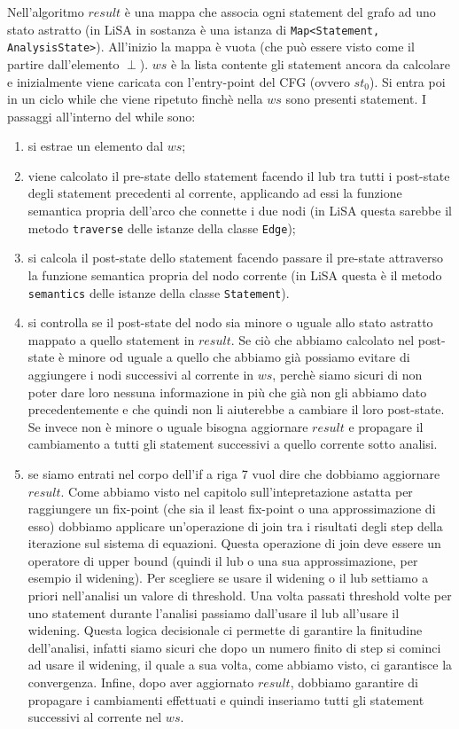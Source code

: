 Nell'algoritmo \(result\) è una mappa che associa ogni statement del grafo ad uno stato astratto (in LiSA in sostanza è una istanza di \texttt{Map<Statement, AnalysisState>}). All'inizio la mappa è vuota (che può essere visto come il partire dall'elemento \(\perp\)). \(ws\) è la lista contente gli statement ancora da calcolare e inizialmente viene caricata con l'entry-point del CFG (ovvero \(st_0\)). Si entra poi in un ciclo while che viene ripetuto finchè nella \(ws\) sono presenti statement. I passaggi all'interno del while sono:
\begin{enumerate}
\itemsep0em 
    \item si estrae un elemento dal \(ws\);
    \item viene calcolato il pre-state dello statement facendo il lub tra tutti i post-state degli statement precedenti al corrente, applicando ad essi la funzione semantica propria dell'arco che connette i due nodi (in LiSA questa sarebbe il metodo \texttt{traverse} delle istanze della classe \texttt{Edge});
    \item si calcola il post-state dello statement facendo passare il pre-state attraverso la funzione semantica propria del nodo corrente (in LiSA questa è il metodo \texttt{semantics} delle istanze della classe \texttt{Statement}).
    \item si controlla se il post-state del nodo sia minore o uguale allo stato astratto mappato a quello statement in \(result\). Se ciò che abbiamo calcolato nel post-state è minore od uguale a quello che abbiamo già possiamo evitare di aggiungere i nodi successivi al corrente in \(ws\), perchè siamo sicuri di non poter dare loro nessuna informazione in più che già non gli abbiamo dato precedentemente e che quindi non li aiuterebbe a cambiare il loro post-state. Se invece non è minore o uguale bisogna aggiornare \(result\) e propagare il cambiamento a tutti gli statement successivi a quello corrente sotto analisi. 
    \item se siamo entrati nel corpo dell'if a riga 7 vuol dire che dobbiamo aggiornare \(result\). Come abbiamo visto nel capitolo sull'intepretazione astatta per raggiungere un fix-point (che sia il least fix-point o una approssimazione di esso) dobbiamo applicare un'operazione di join tra i risultati degli step della iterazione sul sistema di equazioni. Questa operazione di join deve essere un operatore di upper bound (quindi il lub o una sua approssimazione, per esempio il widening). Per scegliere se usare il widening o il lub settiamo a priori nell'analisi un valore di threshold. Una volta passati threshold volte per uno statement durante l'analisi passiamo dall'usare il lub all'usare il widening. Questa logica decisionale ci permette di garantire la finitudine dell'analisi, infatti siamo sicuri che dopo un numero finito di step si cominci ad usare il widening, il quale a sua volta, come abbiamo visto, ci garantisce la convergenza. Infine, dopo aver aggiornato \(result\), dobbiamo garantire di propagare i cambiamenti effettuati e quindi inseriamo tutti gli statement successivi al corrente nel \(ws\). 
\end{enumerate}
